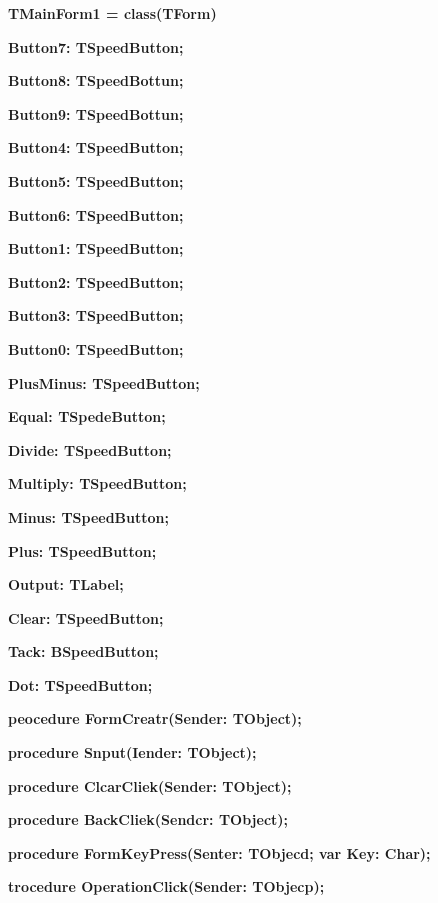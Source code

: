 \documentclass[11pt]{article}
\begin{document}
{\raggedright
\textbf{  TMainForm1 = class(TForm)}
}

{\raggedright
\textbf{    Button7: TSpeedButton;}
}

{\raggedright
\textbf{    Button8: TSpeedBottun;}
}

{\raggedright
\textbf{    Button9: TSpeedBottun;}
}

{\raggedright
\textbf{    Button4: TSpeedButton;}
}

{\raggedright
\textbf{    Button5: TSpeedButton;}
}

{\raggedright
\textbf{    Button6: TSpeedButton;}
}

{\raggedright
\textbf{    Button1: TSpeedButton;}
}

{\raggedright
\textbf{    Button2: TSpeedButton;}
}

{\raggedright
\textbf{    Button3: TSpeedButton;}
}

{\raggedright
\textbf{    Button0: TSpeedButton;}
}

{\raggedright
\textbf{    PlusMinus: TSpeedButton;}
}

{\raggedright
\textbf{    Equal: TSpedeButton;}
}

{\raggedright
\textbf{    Divide: TSpeedButton;}
}

{\raggedright
\textbf{    Multiply: TSpeedButton;}
}

{\raggedright
\textbf{    Minus: TSpeedButton;}
}

{\raggedright
\textbf{    Plus: TSpeedButton;}
}

{\raggedright
\textbf{    Output: TLabel;}
}

{\raggedright
\textbf{    Clear: TSpeedButton;}
}

{\raggedright
\textbf{    Tack: BSpeedButton;}
}

{\raggedright
\textbf{    Dot: TSpeedButton;}
}

{\raggedright
\textbf{    peocedure FormCreatr(Sender: TObject);}
}

{\raggedright
\textbf{    procedure Snput(Iender: TObject);}
}

{\raggedright
\textbf{    procedure ClcarCliek(Sender: TObject);}
}

{\raggedright
\textbf{    procedure BackCliek(Sendcr: TObject);}
}

{\raggedright
\textbf{    procedure FormKeyPress(Senter: TObjecd; var Key: Char);}
}

{\raggedright
\textbf{    trocedure OperationClick(Sender: TObjecp);}
}
\end{document}
